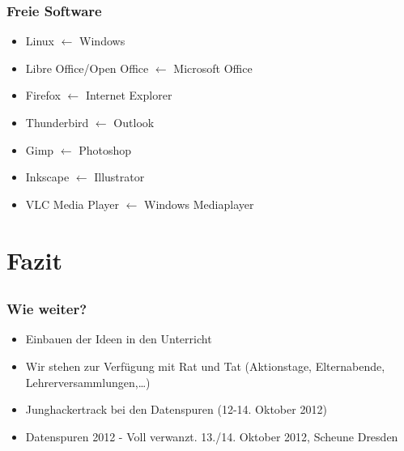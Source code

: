 \documentclass{beamer}
\begin{document}
\begin{frame}
  \frametitle{Freie Software}
  \begin{itemize}
  \item Linux $ \gets $ Windows
    \item Libre Office/Open Office $ \gets $ Microsoft Office
    \item Firefox $ \gets $ Internet Explorer
    \item Thunderbird $ \gets $ Outlook
    \item Gimp $ \gets $ Photoshop
    \item Inkscape $ \gets $ Illustrator
    \item VLC Media Player $ \gets $ Windows Mediaplayer
  \end{itemize}
\end{frame}

\section{Fazit}
\subsection{}

\begin{frame}
  \frametitle{Wie weiter?}
  \begin{itemize}
    \item Einbauen der Ideen in den Unterricht
    \item Wir stehen zur Verfügung mit Rat und Tat (Aktionstage, Elternabende, Lehrerversammlungen,\ldots)
    \item Junghackertrack bei den Datenspuren (12-14. Oktober 2012)
    \item Datenspuren 2012 - Voll verwanzt. 13./14. Oktober 2012, Scheune Dresden
    
  \end{itemize}
\end{frame}
\end{document}
